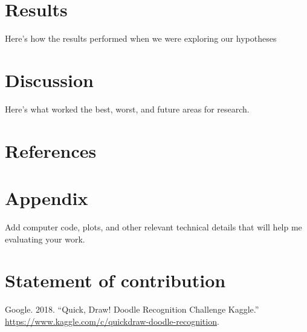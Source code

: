 \documentclass[]{article}
\begin{document}
\section{Results}\label{results}

Here's how the results performed when we were exploring our hypotheses

\section{Discussion}\label{discussion}

Here's what worked the best, worst, and future areas for research.

\section{References}\label{references}

\section{Appendix}\label{appendix}

Add computer code, plots, and other relevant technical details that will
help me evaluating your work.

\section*{Statement of contribution}\label{statement-of-contribution}

\hypertarget{refs}{}
\hypertarget{ref-QuickDra10}{}
Google. 2018. ``Quick, Draw! Doodle Recognition Challenge \textbar{}
Kaggle.'' \url{https://www.kaggle.com/c/quickdraw-doodle-recognition}.
\end{document}
